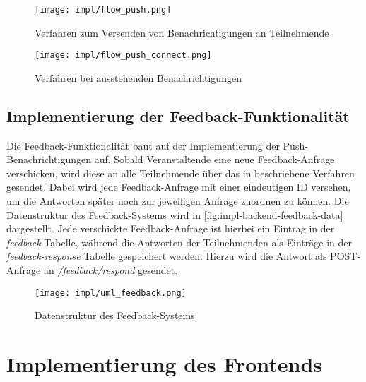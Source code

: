 \begin{figure}[htpb]
    \centering
    \texttt{[image: impl/flow\_push.png]}
    \caption{Verfahren zum Versenden von Benachrichtigungen an Teilnehmende}
    \label{fig:impl-backend-push}
\end{figure}

\begin{figure}[htpb]
    \centering
    \texttt{[image: impl/flow\_push\_connect.png]}
    \caption{Verfahren bei ausstehenden Benachrichtigungen}
    \label{fig:impl-backend-push-connect}
\end{figure}

\subsection{Implementierung der Feedback-Funktionalität}

Die Feedback-Funktionalität baut auf der Implementierung der
Push-Benachrichtigungen auf. Sobald Veranstaltende eine neue Feedback-Anfrage
verschicken, wird diese an alle Teilnehmende über das in
 beschriebene Verfahren gesendet. Dabei wird
jede Feedback-Anfrage mit einer eindeutigen ID versehen, um die Antworten später
noch zur jeweiligen Anfrage zuordnen zu können. Die Datenstruktur des
Feedback-Systems wird in \autoref{fig:impl-backend-feedback-data} dargestellt.
Jede verschickte Feedback-Anfrage ist hierbei ein Eintrag in der
\textit{feedback} Tabelle, während die Antworten der Teilnehmenden als Einträge
in der \textit{feedback-response} Tabelle gespeichert werden. Hierzu wird die
Antwort als POST-Anfrage an \textit{/feedback/respond} gesendet.

\begin{figure}[htpb]
    \centering
    \texttt{[image: impl/uml\_feedback.png]}
    \caption{Datenstruktur des Feedback-Systems}
    \label{fig:impl-backend-feedback-data}
\end{figure}



\section{Implementierung des Frontends}

